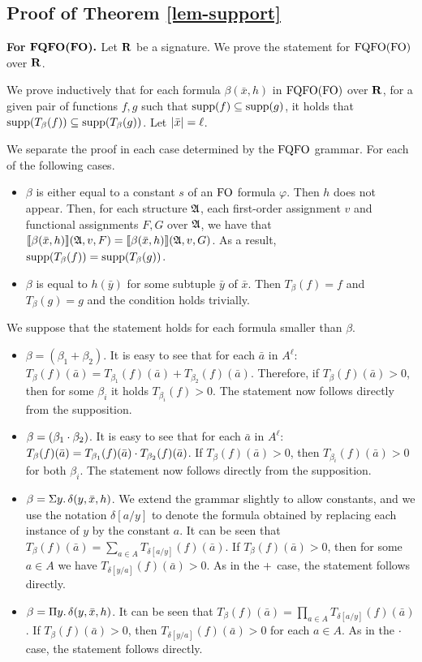 
\subsection*{Proof of Theorem \ref{lem-support}}

{\bf For }$\boldsymbol{{\rm FQFO}({\rm FO}).}$ Let $\mathbf{R}$ be a signature. We prove the statement for ${\rm FQFO}({\rm FO})$ over $\mathbf{R}$.

We prove inductively that for each formula $\beta(\bar{x},h)$ in ${\rm FQFO}({\rm FO})$ over $\mathbf{R}$, for a given pair of functions $f,g$ such that $\text{\rm supp}(f)\subseteq\text{\rm supp}(g)$, it holds that $\text{\rm supp}(T_{\beta}(f))\subseteq\text{\rm supp}(T_{\beta}(g))$. Let $\vert \bar{x} \vert = \ell$.

We separate the proof in each case determined by the ${\rm FQFO}$ grammar. For each of the following cases.
\begin{itemize}
\item $\beta$ is either equal to a constant $s$ of an ${\rm FO}$ formula $\varphi$. Then $h$ does not appear. Then, for each structure $\mathfrak{A}$, each first-order assignment $v$ and functional assignments $F,G$ over $\mathfrak{A}$, we have that ${\llbracket{}{\beta(\bar{x},h)}\rrbracket}(\mathfrak{A},v,F) = {\llbracket{}{\beta(\bar{x},h)}\rrbracket}(\mathfrak{A},v,G)$. As a result, $\text{\rm supp}(T_{\beta}(f)) = \text{\rm supp}(T_{\beta}(g))$.
\item $\beta$ is equal to $h(\bar{y})$ for some subtuple $\bar{y}$ of $\bar{x}$. Then $T_{\beta}(f) = f$ and $T_{\beta}(g) = g$ and the condition holds trivially.
\end{itemize}
We suppose that the statement holds for each formula smaller than $\beta$.
\begin{itemize}
\item $\beta = (\beta_1 + \beta_2)$. It is easy to see that for each $\bar{a}$ in $A^{\ell}$: $T_{\beta}(f)(\bar{a}) = T_{\beta_1}(f)(\bar{a}) + T_{\beta_2}(f)(\bar{a})$. Therefore, if $T_{\beta}(f)(\bar{a}) > 0$, then for some $\beta_i$ it holds $T_{\beta_i}(f) > 0$. The statement now follows directly from the supposition.
\item $\beta = (\beta_1 \cdot \beta_2)$. It is easy to see that for each $\bar{a}$ in $A^{\ell}$: $T_{\beta}(f)(\bar{a}) = T_{\beta_1}(f)(\bar{a}) \cdot T_{\beta_2}(f)(\bar{a})$. If $T_{\beta}(f)(\bar{a}) > 0$, then $T_{\beta_i}(f)(\bar{a}) > 0$ for both $\beta_i$. The statement now follows directly from the supposition.
\item $\beta = \Sigma{y}.\,\delta(y,\bar{x},h)$. We extend the grammar slightly to allow constants, and we use the notation $\delta[a/y]$ to denote the formula obtained by replacing each instance of $y$ by the constant $a$. It can be seen that $T_{\beta}(f)(\bar{a}) = \sum_{a \in A} T_{\delta[a/y]}(f)(\bar{a})$. If $T_{\beta}(f)(\bar{a}) > 0$, then for some $a\in A$ we have $T_{\delta[y/a]}(f)(\bar{a}) > 0$. As in the $+$ case, the statement follows directly.
\item $\beta = \Pi{y}.\,\delta(y,\bar{x},h)$. It can be seen that $T_{\beta}(f)(\bar{a}) = \prod_{a \in A} T_{\delta[a/y]}(f)(\bar{a})$. If $T_{\beta}(f)(\bar{a}) > 0$, then $T_{\delta[y/a]}(f)(\bar{a}) > 0$ for each $a\in A$. As in the $\cdot$ case, the statement follows directly.
\end{itemize}
